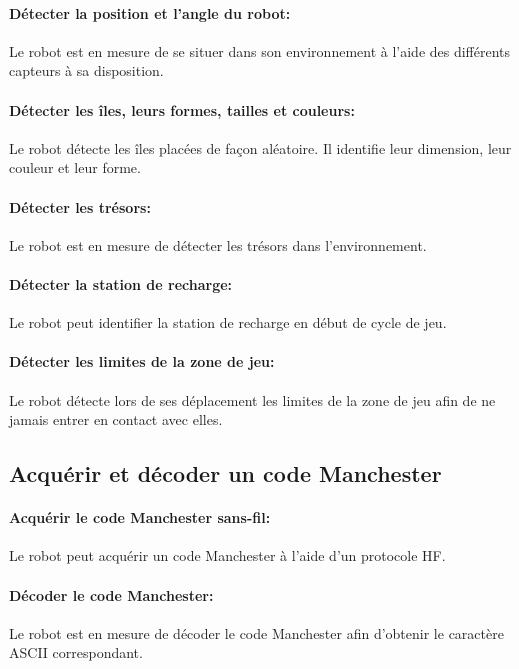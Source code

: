 \paragraph{Détecter la position et l'angle du robot:}
Le robot est en mesure de se situer dans son environnement à l'aide des différents capteurs à sa disposition.

\paragraph{Détecter les îles, leurs formes, tailles et couleurs:}
Le robot détecte les îles placées de façon aléatoire. Il identifie leur dimension, leur couleur et leur forme.

\paragraph{Détecter les trésors:}
Le robot est en mesure de détecter les trésors dans l'environnement.

\paragraph{Détecter la station de recharge:}
Le robot peut identifier la station de recharge en début de cycle de jeu.

\paragraph{Détecter les limites de la zone de jeu:}
Le robot détecte lors de ses déplacement les limites de la zone de jeu afin de ne jamais entrer en contact avec elles.

\subsection{Acquérir et décoder un code Manchester}

\paragraph{Acquérir le code Manchester sans-fil:}
Le robot peut acquérir un code Manchester à l'aide d'un protocole HF.

\paragraph{Décoder le code Manchester:}
Le robot est en mesure de décoder le code Manchester afin d'obtenir le caractère ASCII correspondant.

